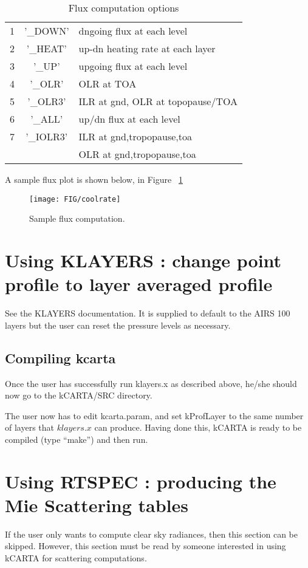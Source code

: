 \documentclass[12pt]{article}
\newcommand{\kc}{\textsf{kCARTA}\xspace}
\newlength{\colwidth}
\begin{document}
\begin{longtable}{|c|c|p{\colwidth}|}
\caption{Flux computation options}\\
\hline
   1 & '\_DOWN'  & dngoing flux at each level \\
   2 & '\_HEAT'  & up-dn heating rate at each layer \\
   3 & '\_UP'    & upgoing flux at each level \\
   4 & '\_OLR'   & OLR at TOA \\
   5 & '\_OLR3'  & ILR at gnd, OLR at topopause/TOA \\
   6 & '\_ALL'   & up/dn flux at each level \\
   7 & '\_IOLR3' & ILR at gnd,tropopause,toa \\
     &           & OLR at gnd,tropopause,toa \\
\hline
\end{longtable}

A sample flux plot is shown below, in Figure ~\ref{sampleflux}

\begin{figure}
\texttt{[image: FIG/coolrate]}
\caption{Sample flux computation.}
\label{sampleflux}
\end{figure}

\section{Using KLAYERS : change point profile to layer averaged profile}
See the KLAYERS documentation. It is supplied to default to the AIRS 100 layers
but the user can reset the pressure levels as necessary.

\subsection{Compiling kcarta}
Once the user has successfully run klayers.x as described above, he/she should
now go to the kCARTA/SRC directory. 

The user now has to edit kcarta.param, and set kProfLayer to the same number 
of layers that $klayers.x$ can produce. Having 
done this, \kc is ready to be compiled (type ``make'') and then run.

\section{Using RTSPEC : producing the Mie Scattering tables}
If the user only wants to compute clear sky radiances, then this section can 
be skipped. However, this section must be read by someone interested in using
\kc for scattering computations. 
\end{document}
